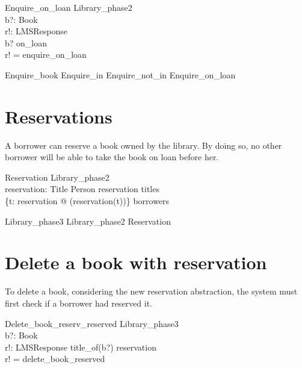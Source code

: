 \documentclass[11pt, fuzz]{article}
\begin{document}
\begin{schema}{Enquire\_on\_loan}
    \Xi Library\_phase2  \\
    b?: Book              \\
    r!: LMSResponse       \\
\where
    b? \in on\_loan       \\
    r! = enquire\_on\_loan\\
\end{schema}

\begin{zed}
    Enquire\_book  Enquire\_in \land Enquire\_not\_in \land Enquire\_on\_loan
\end{zed}


\section{Reservations}

A borrower can reserve a book owned by the library. By doing so, no other borrower will be able to take the book on loan before her. 

\begin{schema}{Reservation}
    Library\_phase2                        \\
    reservation: Title \pfun \iseq Person
\where
    \dom reservation \subseteq titles  \\
    \bigcup \{t: \dom reservation @ \ran(reservation(t))\} \subseteq borrowers
\end{schema}

\begin{zed}
Library\_phase3  Library\_phase2 \land Reservation
\end{zed}

\section{Delete a book with reservation}

To delete a book, considering the new reservation abstraction, the system must first check if a borrower had reserved it. 

\begin{schema}{Delete\_book\_reserv\_reserved}
    \Xi Library\_phase3 \\
    b?: Book            \\
    r!: LMSResponse
\where
    title\_of(b?) \in \dom reservation \\
    r! = delete\_book\_reserved
\end{schema}
\end{document}
